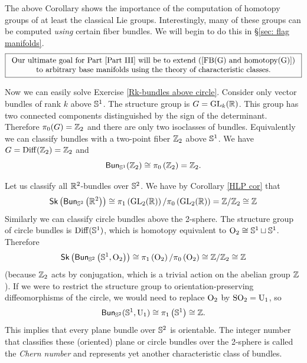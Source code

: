 The above Corollary shows the importance of the computation of homotopy groups of at least the classical Lie groups. Interestingly, many of these groups can be computed \emph{using} certain fiber bundles. We will begin to do this in \S\ref{sec: flag manifolds}.
\[\boxed{\begin{array}{c}
    \text{Our ultimate goal for Part \ref{Part III} will be to extend (\ref{FB(G) and homotopy(G)})}\\
    \text{to arbitrary base manifolds using the theory of characteristic classes.}
\end{array}}
\] 


\begin{example}
    Now we can easily solve Exercise \ref{Rk-bundles above circle}. Consider only vector bundles of rank $k$ above $\mathbb{S}^1$. The structure group is $G=\operatorname{GL}_k(\mathbb{R})$. This group has two connected components distinguished by the sign of the determinant. Therefore $\pi_0(G)=\mathbb{Z}_2$ and there are only two isoclasses of bundles. Equivalently we can classify bundles with a two-point fiber $\mathbb{Z}_2$ above $\mathbb{S}^1$. We have $G=\operatorname{Diff}(\mathbb{Z}_2)=\mathbb{Z}_2$ and
    \[
        \mathsf{Bun}_{\mathbb{S}^1}(\mathbb{Z}_2)\cong \pi_{0}\left(\mathbb{Z}_2\right)=\mathbb{Z}_2.
    \]
    \end{example}
    \begin{example}
    Let us classify all $\mathbb{R}^2$-bundles over $\mathbb{S}^2$. We have by Corollary \ref{HLP cor} that 
    \[
        \mathsf{Sk}\left(\mathsf{Bun}_{\mathbb{S}^2}\left(\mathbb{R}^2\right)\right)\cong \pi_{1}\left(\operatorname{GL}_2(\mathbb{R} )\right)/\pi_0\left(\operatorname{GL}_2(\mathbb{R} )\right)=\mathbb{Z}/\mathbb{Z}_2\cong \mathbb{Z}
    \]
    Similarly we can classify circle bundles above the 2-sphere. The structure group of circle bundles is $\operatorname{Diff}(\mathbb{S}^1)$, which is homotopy equivalent to $\operatorname{O}_2\cong \mathbb{S}^1\sqcup \mathbb{S}^1$. Therefore
    \[
        \mathsf{Sk}\left(\mathsf{Bun}_{\mathbb{S}^2}\left(\mathbb{S}^1,\operatorname{O}_2\right)\right)\cong \pi_{1}\left(\operatorname{O}_2\right)/\pi_0\left(\operatorname{O}_2\right)\cong\mathbb{Z}/\mathbb{Z}_2\cong\mathbb{Z}
    \]
    (because $\mathbb{Z}_2$ acts by conjugation, which is a trivial action on the abelian group $\mathbb{Z}$). If we were to restrict the structure group to orientation-preserving diffeomorphisms of the circle, we would need to replace $\operatorname{O}_2$ by $\operatorname{SO}_2=\operatorname{U}_1$, so 
    \[
        \mathsf{Bun}_{\mathbb{S}^2}(\mathbb{S}^1,\operatorname{U}_1)\cong \pi_{1}\left(\mathbb{S}^1\right)\cong\mathbb{Z}.
    \]
    This implies that every plane bundle over $\mathbb{S}^2$ is orientable. The integer number that classifies these (oriented) plane or circle bundles over the 2-sphere is called the \emph{Chern number} and represents yet another characteristic class of bundles.
\end{example}

